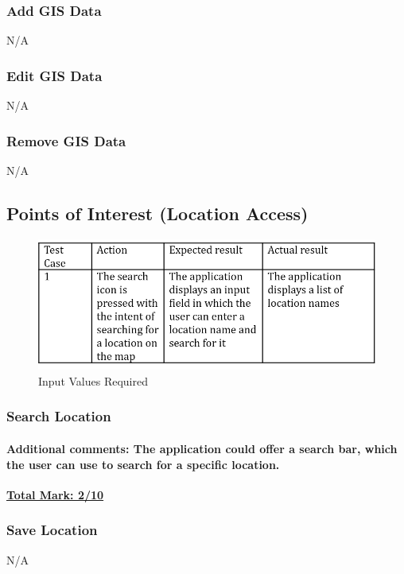 \documentclass[english]{article}
\begin{document}
\subsubsection{Add GIS Data}
N/A

\subsubsection{Edit GIS Data}
N/A

\subsubsection{Remove GIS Data}
N/A

\subsection{Points of Interest (Location Access)}

\begin{figure}[H]
\centering
\includegraphics[width=1.0\textwidth]{9.1}
\caption{Input Values Required}
\end{figure}


\subsubsection{Search Location}

\paragraph{Additional comments: \newline The application could offer a search bar, which the user can use to search for a specific location. \newline}
\textbf{\underline{Total Mark: 2/10}}







\subsubsection{Save Location}
N/A
\end{document}
